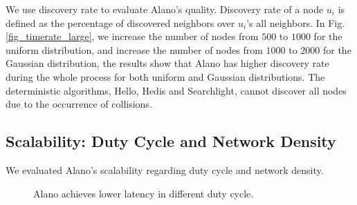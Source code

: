 We use discovery rate to evaluate Alano's quality.
Discovery rate of a node $u_i$ is defined as the percentage of discovered neighbors over $u_i$'s all neighbors.
In Fig. \ref{fig_timerate_large}, we increase the number of nodes from $500$ to $1000$ for the uniform distribution, and increase the number of nodes from $1000$ to $2000$ for the Gaussian distribution, the results show that Alano has higher discovery rate during the whole process for both uniform and Gaussian distributions. The deterministic algorithms, Hello, Hedis and Searchlight, cannot discover all nodes due to the occurrence of collisions.





\subsection{Scalability: Duty Cycle and Network Density}

We evaluated Alano's scalability regarding duty cycle and network density.

\begin{figure}[!h]
\centering
{}
\hspace{0.01in}
\caption{Alano achieves lower latency in different duty cycle.}
\label{fig_dutycycle}
\end{figure}


